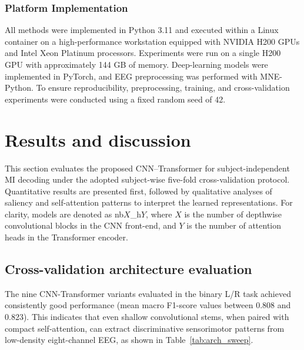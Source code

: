 \documentclass[a4paper,fleqn]{cas-dc}
\begin{document}
\subsubsection{Platform Implementation}
All methods were implemented in Python 3.11 and executed within a Linux container on a high-performance workstation equipped with NVIDIA H200 GPUs and Intel Xeon Platinum processors. Experiments were run on a single H200 GPU with approximately 144 GB of memory. Deep-learning models were implemented in PyTorch, and EEG preprocessing was performed with MNE-Python. To ensure reproducibility, preprocessing, training, and cross-validation experiments were conducted using a fixed random seed of 42. 


\section{Results and discussion}
\label{sec:results}
This section evaluates the proposed CNN–Transformer for subject-independent MI decoding under the adopted subject-wise five-fold cross-validation protocol. Quantitative results are presented first, followed by qualitative analyses of saliency and self-attention patterns to interpret the learned representations. For clarity, models are denoted as nb$X$\_h$Y$, where $X$ is the number of depthwise convolutional blocks in the CNN front-end, and $Y$ is the number of attention heads in the Transformer encoder.

\subsection{Cross-validation architecture evaluation}
\label{subsec:train_performance}

The nine CNN-Transformer variants evaluated in the binary L/R task achieved consistently good performance (mean macro F1-score values between 0.808 and 0.823). This indicates that even shallow convolutional stems, when paired with compact self-attention, can extract discriminative sensorimotor patterns from low-density eight-channel EEG, as shown in Table~\ref{tab:arch_sweep}.
\end{document}

